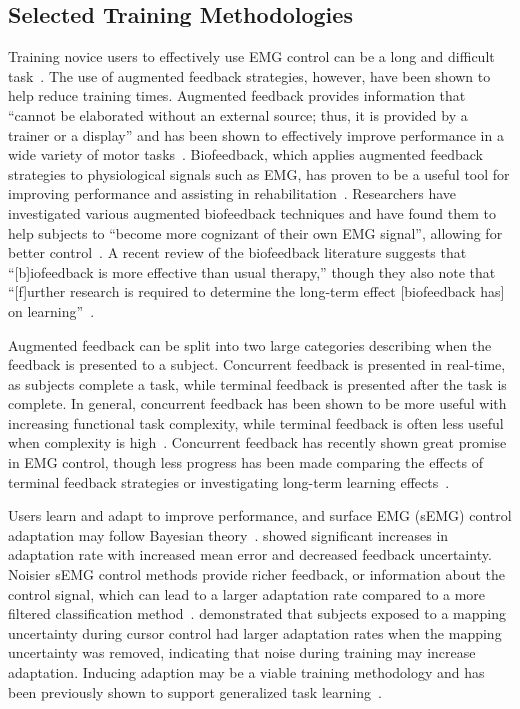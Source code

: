 \subsection{Selected Training Methodologies}
Training novice users to effectively use EMG control can be a long and difficult task~\citep{RN24}.
The use of augmented feedback strategies, however, have been shown to help reduce training times.
Augmented feedback provides information that ``cannot be elaborated without an external source; thus, it is provided by a trainer or a display'' and has been shown to effectively improve performance in a wide variety of motor tasks~\citep{sigrist_augmented_2013}.
Biofeedback, which applies augmented feedback strategies to physiological signals such as EMG, has proven to be a useful tool for improving performance and assisting in rehabilitation~\citep{RN26}.
Researchers have investigated various augmented biofeedback techniques and have found them to help subjects to ``become more cognizant of their own EMG signal'', allowing for better control~\citep{RN27}.
A recent review of the biofeedback literature suggests that ``[b]iofeedback is more effective than usual therapy,'' though they also note that ``[f]urther research is required to determine the long-term effect [biofeedback has] on learning''~\citep{RN28}.

Augmented feedback can be split into two large categories describing when the feedback is presented to a subject.
Concurrent feedback is presented in real-time, as subjects complete a task, while terminal feedback is presented after the task is complete.
In general, concurrent feedback has been shown to be more useful with increasing functional task complexity, while terminal feedback is often less useful when complexity is high~\citep{sigrist_augmented_2013}.
Concurrent feedback has recently shown great promise in EMG control, though less progress has been made comparing the effects of terminal feedback strategies or investigating long-term learning effects~\citep{RN29, RN30, RN31, RN32}.

Users learn and adapt to improve performance, and surface EMG (sEMG) control adaptation may follow Bayesian theory~\citep{RN33}.
\citeauthor{RN33} showed significant increases in adaptation rate with increased mean error and decreased feedback uncertainty.
Noisier sEMG control methods provide richer feedback, or information about the control signal, which can lead to a larger adaptation rate compared to a more filtered classification method~\citep{RN34}.
\citeauthor{RN35} demonstrated that subjects exposed to a mapping uncertainty during cursor control had larger adaptation rates when the mapping uncertainty was removed, indicating that noise during training may increase adaptation.
Inducing adaption may be a viable training methodology and has been previously shown to support generalized task learning~\citep{RN36}.

